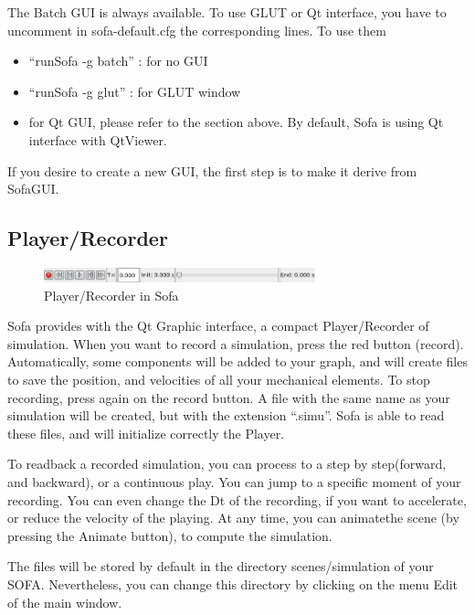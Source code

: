 The Batch GUI is always available. To use GLUT or Qt interface, you have to uncomment in sofa-default.cfg the corresponding lines. To use them
\begin{itemize}
 \item ``runSofa -g batch'' : for no GUI
 \item ``runSofa -g glut'' : for GLUT window 
 \item for Qt GUI, please refer to the section above. By default, Sofa is using Qt interface with QtViewer.
\end{itemize}
If you desire to create a new GUI, the first step is to make it derive from SofaGUI. 






\subsection{Player/Recorder}

\begin{figure}[htpb]
	\centering
		\includegraphics[width=0.7\textwidth]{GUI/GUI_recorder.png}
	\caption{Player/Recorder in Sofa} 	
\end{figure}
Sofa provides with the Qt Graphic interface, a compact Player/Recorder of simulation. When you want to record a simulation, press the red button (record). Automatically, some components will be added to your graph, and will create files to save the position, and velocities of all your mechanical elements. To stop recording, press again on the record button. A file with the same name as your simulation will be created, but with the extension ``.simu''. Sofa is able to read these files, and will initialize correctly the Player. 
\par
To readback a recorded simulation, you can process to a step by step(forward, and backward), or a continuous play. You can jump to a specific moment of your recording. You can even change the Dt of the recording, if you want to accelerate, or reduce the velocity of the playing. At any time, you can animatethe scene (by pressing the Animate button), to compute the simulation. 
\par
The files will be stored by default in the directory scenes/simulation of your SOFA. Nevertheless, you can change this directory by clicking on the menu Edit of the main window.

